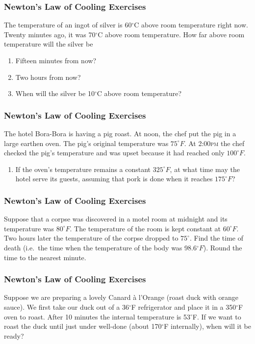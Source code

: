 \documentclass[xcolor=dvipsnames]{beamer}
\begin{document}
\begin{frame}
  \frametitle{Newton's Law of Cooling Exercises}
  {\ubung} The temperature of an ingot of silver is 60$^{\circ}$C above room
  temperature right now. Twenty minutes ago, it was 70$^{\circ}$C above room
  temperature. How far above room temperature will the silver be
  \begin{enumerate}
  \item Fifteen minutes from now? 
  \item Two hours from now? 
  \item When will the silver be 10$^{\circ}$C above room temperature? 
  \end{enumerate}
\end{frame}

\begin{frame}
  \frametitle{Newton's Law of Cooling Exercises}
  {\ubung} The hotel Bora-Bora is having a pig roast. At noon, the chef put the
  pig in a large earthen oven. The pig's original temperature was
  $75^{\circ}F$. At 2:00\textsc{pm} the chef checked the pig's
  temperature and was upset because it had reached only
  $100^{\circ}F$.
\begin{enumerate}
\item If the oven's temperature remains a constant $325^{\circ}F$, at
  what time may the hotel serve its guests, assuming that pork is done
  when it reaches $175^{\circ}F$?
\end{enumerate}
\end{frame}

\begin{frame}
  \frametitle{Newton's Law of Cooling Exercises}
  {\ubung} Suppose that a corpse was discovered in a motel room at
  midnight and its temperature was $80^{\circ}F$. The temperature of
  the room is kept constant at $60^{\circ}F$. Two hours later the
  temperature of the corpse dropped to $75^{\circ}$. Find the time of
  death (i.e.\ the time when the temperature of the body was
  98.6$^{\circ}F$). Round the time to the nearest minute.
\end{frame}

\begin{frame}
  \frametitle{Newton's Law of Cooling Exercises}
  {\ubung} Suppose we are preparing a lovely Canard {\`a} l'Orange
  (roast duck with orange sauce). We first take our duck out of a
  36$^{\circ}$F refrigerator and place it in a 350$^{\circ}$F oven to
  roast. After 10 minutes the internal temperature is 53$^{\circ}$F.
  If we want to roast the duck until just under well-done (about
  170$^{\circ}$F internally), when will it be ready?
\end{frame}
\end{document}
